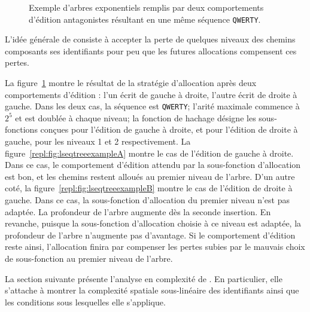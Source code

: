 \begin{figure}
  \begin{center}
    \caption[Gestion des comportements d'édition par \LSEQ]
    {\label{repl:fig:lseqtreeexample} Exemple d'arbres exponentiels \LSEQ
      remplis par deux comportements d'édition antagonistes résultant en une
      même séquence \texttt{QWERTY}.}
  \end{center}
\end{figure}

L'idée générale de \LSEQ consiste à accepter la perte de quelques niveaux des
chemins composants ses identifiants pour peu que les futures allocations
compensent ces pertes.


La figure~\ref{repl:fig:lseqtreeexample} montre le résultat de la stratégie
d'allocation \LSEQ après deux comportements d'édition : l'un écrit de gauche à
droite, l'autre écrit de droite à gauche. Dans les deux cas, la séquence est
\texttt{QWERTY}; l'arité maximale commence à $2^5$ et est doublée à chaque
niveau; la fonction de hachage désigne les sous-fonctions conçues pour l'édition
de gauche à droite, et pour l'édition de droite à gauche, pour les niveaux 1 et
2 respectivement. La figure~\ref{repl:fig:lseqtreeexampleA} montre le cas de
l'édition de gauche à droite. Dans ce cas, le comportement d'édition attendu par
la sous-fonction d'allocation est bon, et les chemins restent alloués au premier
niveau de l'arbre. D'un autre coté, la figure~\ref{repl:fig:lseqtreeexampleB}
montre le cas de l'édition de droite à gauche. Dans ce cas, la sous-fonction
d'allocation du premier niveau n'est pas adaptée. La profondeur de l'arbre
augmente dès la seconde insertion. En revanche, puisque la sous-fonction
d'allocation choisie à ce niveau est adaptée, la profondeur de l'arbre
n'augmente pas d'avantage. Si le comportement d'édition reste ainsi,
l'allocation finira par compenser les pertes subies par le mauvais choix de
sous-fonction au premier niveau de l'arbre.

La section suivante présente l'analyse en complexité de \LSEQ. En particulier,
elle s'attache à montrer la complexité spatiale sous-linéaire des identifiants
ainsi que les conditions sous lesquelles elle s'applique.

